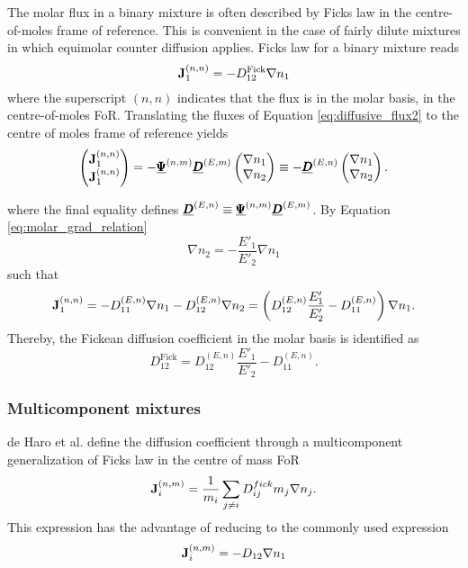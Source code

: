 The molar flux in a binary mixture is often described by Ficks law in the centre-of-moles frame of reference. This is convenient in the case of fairly dilute mixtures in which equimolar counter diffusion applies. Ficks law for a binary mixture reads
\begin{equation}
    \boldsymbol{\mathrm{J}}_{1}^{(n,n)} = - D_{12}^{\text{Fick}}\nabla n_1
\end{equation}
where the superscript $(n, n)$ indicates that the flux is in the molar basis, in the centre-of-moles FoR. Translating the fluxes of Equation \eqref{eq:diffusive_flux2} to the centre of moles frame of reference yields
\begin{equation}
    \begin{pmatrix} \boldsymbol{\mathrm{J}}_{1}^{(n,n)} \\ \boldsymbol{\mathrm{J}}_{1}^{(n,n)} \end{pmatrix}
    =
    - \underline{\pmb{\Psi}}^{(n,m)}\underline{\pmb{D}}^{(E,m)} \begin{pmatrix} \nabla n_1 \\ \nabla n_2 \end{pmatrix}
    \equiv
    - \underline{\pmb{D}}^{(E,n)} \begin{pmatrix} \nabla n_1 \\ \nabla n_2 \end{pmatrix}.
\end{equation}

where the final equality defines $\underline{\pmb{D}}^{(E,n)} \equiv \underline{\pmb{\Psi}}^{(n,m)}\underline{\pmb{D}}^{(E,m)}$. By Equation \eqref{eq:molar_grad_relation}
\begin{equation}
    \nabla n_2 = - \frac{E'_1}{E'_2} \nabla n_1 
\end{equation}
such that 
\begin{equation}
    \boldsymbol{\mathrm{J}}_{1}^{(n,n)} = - D_{11}^{(E,n)} \nabla n_1 - D_{12}^{(E,n)} \nabla n_2 = \left( D_{12}^{(E,n)} \frac{E'_1}{E'_2} - D_{11}^{(E,n)} \right) \nabla n_1.
\end{equation}
Thereby, the Fickean diffusion coefficient in the molar basis is identified as
\begin{equation}
    D_{12}^{\text{Fick}} = D_{12}^{(E,n)} \frac{E'_1}{E'_2} - D_{11}^{(E,n)}.
\end{equation}

\subsubsection{Multicomponent mixtures}

de Haro et al. define the diffusion coefficient through a multicomponent generalization of Ficks law in the centre of mass FoR
\begin{equation}
    \boldsymbol{\mathrm{J}}^{(n,m)}_i = \frac{1}{m_i} \sum_{j \neq i} D_{ij}^{fick} m_j \nabla n_j.
    \label{eq:multicomp_fick}
\end{equation}
This expression has the advantage of reducing to the commonly used expression 
\begin{equation}
    \boldsymbol{\mathrm{J}}^{(n,m)}_i = - D_{12} \nabla n_1
\end{equation}

